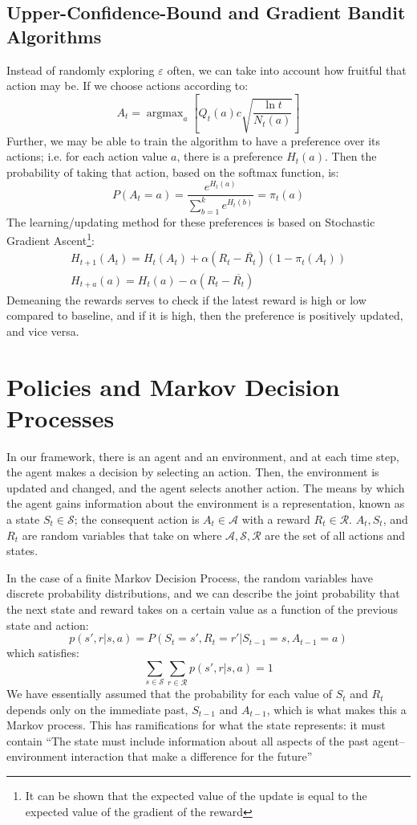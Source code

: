 \documentclass[12pt, reqno]{article}
\theoremstyle{plain}    \newtheorem{theorem}{Theorem}[section]
\theoremstyle{plain}    \newtheorem{lemma}[theorem]{Lemma}
\theoremstyle{plain}    \newtheorem{claim}[theorem]{Claim}
\theoremstyle{plain}    \newtheorem{definition}{Definition}[section]
\theoremstyle{plain}    \newtheorem{proposition}[theorem]{Proposition}
\theoremstyle{plain}    \newtheorem{corollary}[theorem]{Corollary}
\theoremstyle{plain}    \newtheorem{example}[definition]{Example}
\DeclareMathOperator*{\argmax}{argmax}
\newcommand{\eps}{\varepsilon}
\numberwithin{equation}{section}
\begin{document}
\subsection{Upper-Confidence-Bound and Gradient Bandit Algorithms}
Instead of randomly exploring \(\eps\) often, we can take into account how
fruitful that action may be. If we choose actions according to:
\[A_t = \argmax_a \left[Q_t(a) c \sqrt{\frac{\ln t}{N_t(a)}}\right]\]
Further, we may be able to train the algorithm to have a preference over its
actions; i.e. for each action value \(a\), there is a preference \(H_t(a)\).
Then the probability of taking that action, based on the softmax
function, is:
\[P(A_t = a) = \frac{e^{H_t(a)}}{\sum_{b=1}^{k}e^{H_t(b)}} = \pi_t(a)\]
The learning/updating method for these preferences is based on Stochastic
Gradient Ascent\footnote{It can be shown that the expected value of the update
is equal to the expected value of the gradient of the reward}:
\begin{gather*}
	H_{t+1}(A_t) = H_t(A_t) + \alpha(R_t - \overline{R_t})(1 - \pi_t(A_t))\\
	H_{t+a}(a) = H_t(a) - \alpha(R_t - \overline{R_t}) 
\end{gather*}
Demeaning the rewards serves to check if the latest reward is high or low
compared to baseline, and if it is high, then the preference is positively
updated, and vice versa. 

\section{Policies and Markov Decision Processes}
In our framework, there is an agent and an environment, and at each time step,
the agent makes a decision by selecting an action. Then, the environment is
updated and changed, and the agent selects another action. The means by which
the agent gains information about the environment is a representation, known as
a state \(S_t \in \mathcal{S}\); the consequent action is \(A_t \in
\mathcal{A}\) with a reward \(R_t \in \mathcal{R}\). \(A_t, S_t\), and \(R_t\)
are random variables that take on  where \(\mathcal{A},
\mathcal{S}, \mathcal{R}\) are the set of all actions and
states. 

In the case of a finite Markov Decision Process, the random variables have
discrete probability distributions, and we can describe the joint probability that the
next state and reward takes on a certain value as a function of the previous
state and action:
\[p(s',r | s,a) = P(S_t = s', R_t = r'| S_{t-1} = s, A_{t-1} = a)\]
which satisfies:
\[\sum_{s \in \mathcal{S}} \sum_{r \in \mathcal{R}}p(s',r|s,a) = 1\]
We have essentially assumed that the probability for each value of \(S_t\) and
\(R_t\) depends only on the immediate past, \(S_{t-1}\) and \(A_{t-1}\), which
is what makes this a Markov process. This has ramifications for what the state
represents: it must contain ``The state must include information about all aspects
of the past agent–environment interaction that make a difference for the future''
\end{document}
